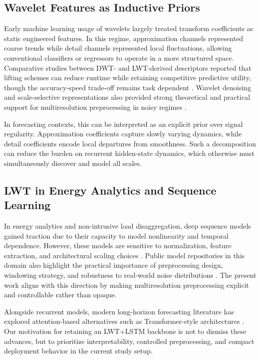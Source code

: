 \documentclass[journal]{IEEEtran}
\begin{document}
\subsection{Wavelet Features as Inductive Priors}
Early machine learning usage of wavelets largely treated transform coefficients as static engineered features. In this regime, approximation channels represented coarse trends while detail channels represented local fluctuations, allowing conventional classifiers or regressors to operate in a more structured space. Comparative studies between DWT- and LWT-derived descriptors reported that lifting schemes can reduce runtime while retaining competitive predictive utility, though the accuracy-speed trade-off remains task dependent \cite{mj2012pcadwtlwt}. Wavelet denoising and scale-selective representations also provided strong theoretical and practical support for multiresolution preprocessing in noisy regimes \cite{donoho1995denoising,percival2000wavelet}.

In forecasting contexts, this can be interpreted as an explicit prior over signal regularity. Approximation coefficients capture slowly varying dynamics, while detail coefficients encode local departures from smoothness. Such a decomposition can reduce the burden on recurrent hidden-state dynamics, which otherwise must simultaneously discover and model all scales.

\subsection{LWT in Energy Analytics and Sequence Learning}
In energy analytics and non-intrusive load disaggregation, deep sequence models gained traction due to their capacity to model nonlinearity and temporal dependence. However, these models are sensitive to normalization, feature extraction, and architectural scaling choices \cite{ylla2024nilm}. Public model repositories in this domain also highlight the practical importance of preprocessing design, windowing strategy, and robustness to real-world noise distributions \cite{yllaRepo}. The present work aligns with this direction by making multiresolution preprocessing explicit and controllable rather than opaque.

Alongside recurrent models, modern long-horizon forecasting literature has explored attention-based alternatives such as Transformer-style architectures \cite{vaswani2017attention,lim2021tft,wu2021autoformer}. Our motivation for retaining an LWT+LSTM backbone is not to dismiss these advances, but to prioritize interpretability, controlled preprocessing, and compact deployment behavior in the current study setup.
\end{document}

